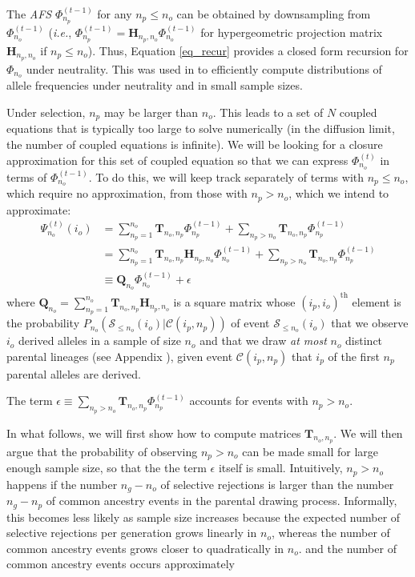 \documentclass[9pt,twocolumn,twoside,lineno]{gsajnl}
\newcommand{\afs}[2]{\Phi_{#1}^{(#2)}}
\newcommand{\afsPsi}[2]{\Psi_{#1}^{(#2)}}
\newcommand{\ms}{\mathcal{S}}
\begin{document}
The \textit{AFS}  $\afs{n_p}{t-1}$ for any  $n_p\leq n_o$ can be obtained by downsampling from $\afs{n_o}{t-1}$ (\textit{i.e.}, $\afs{n_p}{t-1} =
\mathbf{H}_{n_p,n_o} \afs{n_o}{t-1}$ for hypergeometric projection matrix $\mathbf{H}_{n_p,n_o}$ if
$n_p\leq n_o$). Thus, Equation \eqref{eq_recur} provides a closed form recursion for $\Phi_{n_o}$ under neutrality. 
This was used in \cite{JouganousEtAl2017} to efficiently 
compute distributions of allele frequencies under neutrality and in small sample sizes.

Under selection, $n_{p}$ may be larger than $n_o$. This leads to a set of $N$ coupled equations that is typically too large to solve numerically (in the diffusion limit, the number of coupled equations is
infinite). We will be looking for a closure approximation for this set of coupled equation so that we can express $\afs{n_o}{t}$ in terms of $\afs{n_o}{t-1}$. To do this, we will keep track separately of terms with $n_p \leq n_o,$ which require no approximation, from those with $n_p>n_o$, which we intend to approximate:   
\begin{equation}
\begin{split}
  \afsPsi{n_o}{t}(i_o)
  &= \sum_{n_p=1}^{n_{o}} \mathbf{T}_{n_o,n_p}  \afs{n_p}{t-1}+ \sum_{n_p> n_o }  \mathbf{T}_{n_o,n_p} \afs{n_p}{t-1} \\
  &=      \sum_{n_p=1}^{n_{o}} \mathbf{T}_{n_o,n_p} \mathbf{H}_{n_p,n_o} \afs{n_o}{t-1}+ \sum_{n_p> n_o }  \mathbf{T}_{n_o,n_p} \afs{n_p}{t-1} \\
  &\equiv \mathbf{Q}_{n_o}                                               \afs{n_o}{t-1}+ \epsilon
\end{split}
\label{eq_truncated}
\end{equation}
where $\mathbf{Q}_{n_o} =  \sum_{n_p=1}^{n_{o}} \mathbf{T}_{n_o,n_p} \mathbf{H}_{n_p,n_o}$ is a
square matrix whose $(i_p,i_o)^\text{th}$ element is the probability $P_{n_o}(\mathcal{S}_{\leq n_o}
(i_o)| \mathcal{C}(i_p,n_p))$ of event $\ms_{\leq n_o}(i_o)$ that we observe $i_o$ derived alleles
in a sample of size $n_o$ and that we draw \emph{at most} $n_o$ distinct parental lineages (see
Appendix ), given event $\mathcal{C}(i_p,n_p)$ that $i_p$ of the first
$n_p$ parental alleles are derived.  

The term $\epsilon \equiv \sum_{n_p> n_o}  \mathbf{T}_{n_o,n_p} \afs{n_p}{t-1} $ 
accounts for events with $n_p>n_o.$ 

In what follows, we will first show how to compute matrices $\mathbf{T}_{n_o,n_p}.$ We will then argue that the probability of observing $n_p>n_o$ can be made small for large enough sample size, so that the the term $\epsilon$ itself is small.  Intuitively, $n_p>n_o$ happens if the number $n_g-n_o$ of selective rejections is larger than the number $n_g-n_p$ of common ancestry events in the parental drawing process.  Informally, this becomes less likely as sample size increases because the expected number of selective rejections per generation grows linearly in $n_o$, whereas the number of common ancestry events grows closer to quadratically in $n_o$. 
and the number of common ancestry events occurs approximately
\end{document}
